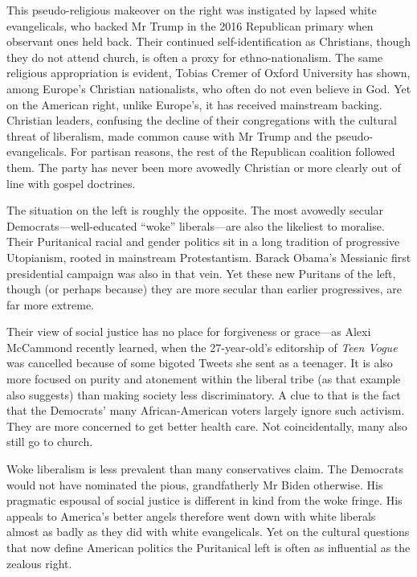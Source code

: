 \documentclass{article}
\begin{document}
This pseudo-religious makeover on the right was instigated by lapsed white evangelicals, who backed Mr Trump in the 2016 Republican primary when observant ones held back. Their continued self-identification as Christians, though they do not attend church, is often a proxy for ethno-nationalism. The same religious appropriation is evident, Tobias Cremer of Oxford University has shown, among Europe's Christian nationalists, who often do not even believe in God. Yet on the American right, unlike Europe's, it has received mainstream backing. Christian leaders, confusing the decline of their congregations with the cultural threat of liberalism, made common cause with Mr Trump and the pseudo-evangelicals. For partisan reasons, the rest of the Republican coalition followed them. The party has never been more avowedly Christian or more clearly out of line with gospel doctrines. 

The situation on the left is roughly the opposite. The most avowedly secular Democrats---well-educated ``woke'' liberals---are also the likeliest to moralise. Their Puritanical racial and gender politics sit in a long tradition of progressive Utopianism, rooted in mainstream Protestantism. Barack Obama's Messianic first presidential campaign was also in that vein. Yet these new Puritans of the left, though (or perhaps because) they are more secular than earlier progressives, are far more extreme. 

Their view of social justice has no place for forgiveness or grace---as Alexi McCammond recently learned, when the 27-year-old's editorship of \emph{Teen Vogue} was cancelled because of some bigoted Tweets she sent as a teenager. It is also more focused on purity and atonement within the liberal tribe (as that example also suggests) than making society less discriminatory. A clue to that is the fact that the Democrats' many African-American voters largely ignore such activism. They are more concerned to get better health care. Not coincidentally, many also still go to church. 

Woke liberalism is less prevalent than many conservatives claim. The Democrats would not have nominated the pious, grandfatherly Mr Biden otherwise. His pragmatic espousal of social justice is different in kind from the woke fringe. His appeals to America's better angels therefore went down with white liberals almost as badly as they did with white evangelicals. Yet on the cultural questions that now define American politics the Puritanical left is often as influential as the zealous right. 
\end{document}
